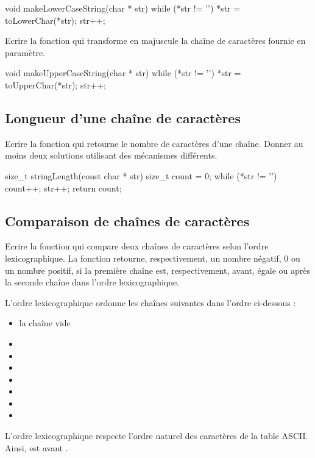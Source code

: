 \begin{csourcecorrection}
void makeLowerCaseString(char * str) {
    while (*str != '\0') {
        *str = toLowerChar(*str);
        str++;
    }
}
\end{csourcecorrection}

Ecrire la fonction  qui transforme en majuscule la chaîne de caractères fournie en paramètre.

\begin{csourcecorrection}
void makeUpperCaseString(char * str) {
    while (*str != '\0') {
        *str = toUpperChar(*str);
        str++;
    }
}
\end{csourcecorrection}

\subsection{Longueur d'une chaîne de caractères}

Ecrire la fonction  qui
retourne le nombre de caractères d'une chaîne. Donner au moins deux solutions
utilisant des mécanismes différents.

\begin{csourcecorrection}
size_t stringLength(const char * str) {
    size_t count = 0;
    while (*str != '\0') {
        count++;
        str++;
    }
    return count;
}
\end{csourcecorrection}

\subsection{Comparaison de chaînes de caractères}

Ecrire la fonction  qui compare deux chaînes de caractères selon l'ordre lexicographique. La fonction retourne, respectivement, un nombre négatif, 0 ou un nombre positif, si la première chaîne est, respectivement, avant, égale ou après la seconde chaîne dans l'ordre lexicographique.

L'ordre lexicographique ordonne les chaînes suivantes dans l'ordre ci-dessous :
\begin{itemize}
  \item {} la chaîne vide
  \item {}
  \item {}
  \item {}
  \item {}
  \item {}
  \item {}
  \item {}
\end{itemize}
L'ordre lexicographique respecte l'ordre naturel des caractères de la table ASCII. Ainsi,  est avant .

